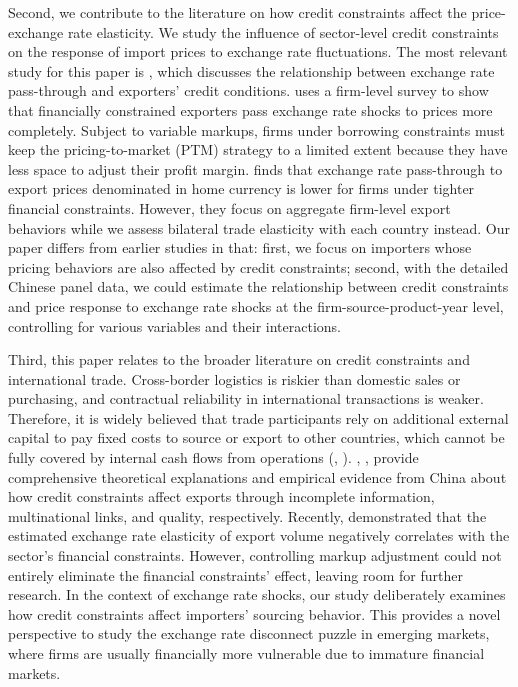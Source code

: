 Second, we contribute to the literature on how credit constraints affect the price-exchange rate elasticity. We study the influence of sector-level credit constraints on the response of import prices to exchange rate fluctuations. The most relevant study for this paper is \cite{strasser2013}, which discusses the relationship between exchange rate pass-through and exporters' credit conditions. \cite{strasser2013} uses a firm-level survey to show that financially constrained exporters pass exchange rate shocks to prices more completely. Subject to variable markups, firms under borrowing constraints must keep the pricing-to-market (PTM) strategy to a limited extent because they have less space to adjust their profit margin. \cite{dai2021} finds that exchange rate pass-through to export prices denominated in home currency is lower for firms under tighter financial constraints. However, they focus on aggregate firm-level export behaviors while we assess bilateral trade elasticity with each country instead. Our paper differs from earlier studies in that: first, we focus on importers whose pricing behaviors are also affected by credit constraints; second, with the detailed Chinese panel data, we could estimate the relationship between credit constraints and price response to exchange rate shocks at the firm-source-product-year level, controlling for various variables and their interactions.

Third, this paper relates to the broader literature on credit constraints and international trade. Cross-border logistics is riskier than domestic sales or purchasing, and contractual reliability in international transactions is weaker. Therefore, it is widely believed that trade participants rely on additional external capital to pay fixed costs to source or export to other countries, which cannot be fully covered by internal cash flows from operations (\cite{manova2013}, \cite{chaney2016}). \cite{feenstra-li-yu2014}, \cite{manova-wei-zhang2015}, \cite{fan-lai-li2015} provide comprehensive theoretical explanations and empirical evidence from China about how credit constraints affect exports through incomplete information, multinational links, and quality, respectively. Recently, \cite{xu-guo2021} demonstrated that the estimated exchange rate elasticity of export volume negatively correlates with the sector’s financial constraints. However, controlling markup adjustment could not entirely eliminate the financial constraints' effect, leaving room for further research. In the context of exchange rate shocks, our study deliberately examines how credit constraints affect importers' sourcing behavior. This provides a novel perspective to study the exchange rate disconnect puzzle in emerging markets, where firms are usually financially more vulnerable due to immature financial markets.

